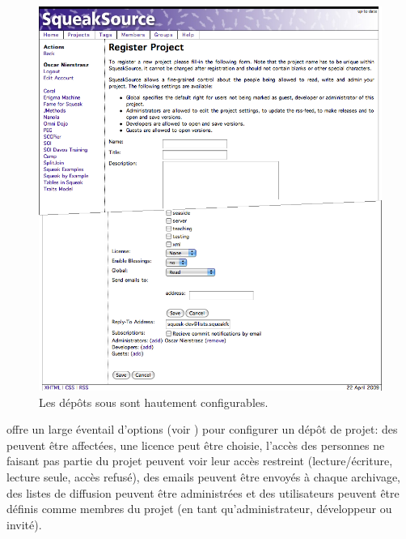 \documentclass[a4paper,10pt,twoside]{book}
\begin{document}
\begin{figure}[ht]\centering
	\includegraphics[width=\textwidth]{squeaksourcesetting}
	\caption{Les dépôts sous \sqsrc sont hautement configurables.}
\end{figure}

\MC offre un large éventail d'options  (voir
) pour configurer un dépôt de projet:
des  peuvent être affectées, une
licence peut être choisie, l'accès des personnes ne faisant pas partie
du projet peuvent voir leur accès restreint (lecture/écriture, lecture
seule, accès refusé), des emails peuvent être envoyés à chaque
archivage, des listes de diffusion peuvent être administrées et des
utilisateurs peuvent être définis comme membres du projet (en tant
qu'administrateur, développeur ou invité).

\end{document}
